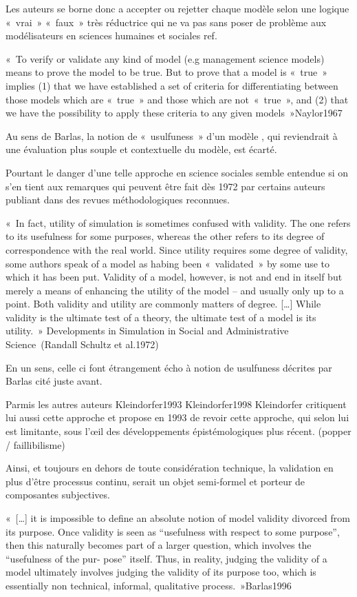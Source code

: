 Les auteurs se borne donc a accepter ou rejetter chaque modèle selon une logique « vrai » « faux » très réductrice qui ne va pas sans poser de problème aux modélisateurs en sciences humaines et sociales {ref}.

« To verify or validate any kind of model (e.g management science models) means to prove the model to be true. But to prove that a model is « true » implies (1) that we have established a set of criteria for differentiating between those models which are « true » and those which are not « true », and (2) that we have the possibility to apply these criteria to any given models »{Naylor1967}

 Au sens de Barlas, la notion de « usulfuness » d'un modèle , qui reviendrait à une évaluation plus souple et contextuelle du modèle, est écarté. 

Pourtant le danger d'une telle approche en science sociales semble entendue si on s'en tient aux remarques qui peuvent être fait dès 1972 par certains auteurs publiant dans des revues méthodologiques reconnues. 
 
 « In fact, utility of simulation is sometimes confused with validity. The one refers to its usefulness for some purposes, whereas the other refers to its degree of correspondence with the real world. Since utility requires some degree of validity, some authors speak of a model as habing been « validated » by some use to which it has been put. Validity of a model, however, is not and end in itself but merely a means of enhancing the utility of the model – and usually only up to a point. Both validity and utility are commonly matters of degree. […] While validity is the ultimate test of a theory, the ultimate test of a model is its utility. » Developments in Simulation in Social and Administrative Science (Randall Schultz et al.1972)

En un sens, celle ci font étrangement écho à notion de usulfuness décrites par Barlas cité juste avant.

Parmis les autres auteurs {Kleindorfer1993} {Kleindorfer1998} Kleindorfer critiquent lui aussi cette approche et propose en 1993 de revoir cette approche, qui selon lui est limitante, sous l’œil des développements épistémologiques plus récent. (popper / faillibilisme)

Ainsi, et toujours en dehors de toute considération technique, la validation en plus d'être processus continu, serait un objet semi-formel et porteur de composantes subjectives.

« […] it is impossible to define an absolute notion of model validity divorced from its purpose. Once validity is seen as “usefulness with respect to some purpose”, then this naturally becomes part of a larger question, which involves the “usefulness of the pur- pose” itself. Thus, in reality, judging the validity of a model ultimately involves judging the validity of its purpose too, which is essentially non technical, informal, qualitative process. »{Barlas1996}

